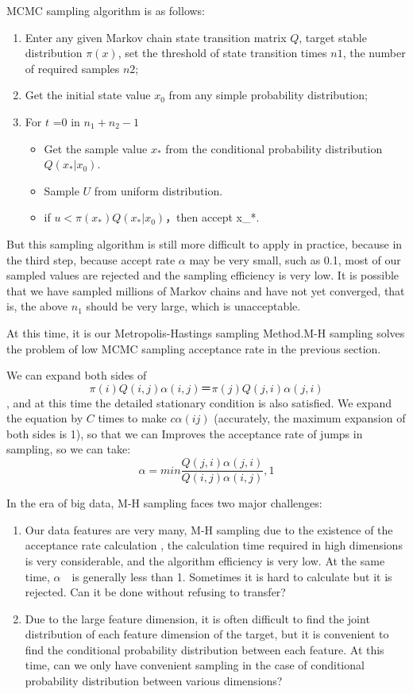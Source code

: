 MCMC sampling algorithm is as follows:
\begin{enumerate}
  \item Enter any given Markov chain state transition matrix $Q$, target stable distribution $\pi(x)$, set the threshold of state transition times $n1$, the number of required samples $n2$;
  \item Get the initial state value $x_0$ from any simple probability distribution;
  \item For $t$ =0 in $n_1+n_2-1$
    \begin{itemize}
      \item Get the sample value $x_*$ from the conditional probability distribution $Q(x_*|x_0)$.
      \item Sample $U$ from uniform distribution.
      \item if $u<\pi(x_*)Q(x_*|x_0)$，then accept x_*.
    \end{itemize}
\end{enumerate}


But this sampling algorithm is still more difficult to apply in practice, because in the third step, because accept rate $\alpha$ may be very small, such as 0.1, most of our sampled values ​​are rejected and the sampling efficiency is very low. It is possible that we have sampled millions of Markov chains and have not yet converged, that is, the above $n_1$ should be  very large, which is unacceptable.

At this time, it is our Metropolis-Hastings sampling Method.M-H sampling solves the problem of low MCMC sampling acceptance rate in the previous section.

We can expand both sides of \[
  \pi(i)Q(i,j)\alpha(i,j) ＝ \pi(j)Q(j,i)\alpha(j,i)
\], and at this time the detailed stationary condition is also satisfied. We expand the equation by $C$ times to make $c\alpha(ij)$ (accurately, the maximum expansion of both sides is 1), so that we can Improves the acceptance rate of jumps in sampling, so we can take:
\[
  \alpha = min{\frac{Q(j,i)\alpha(j,i)}{Q(i,j)\alpha(i,j)},1}
\]

In the era of big data, M-H sampling faces two major challenges:
\begin{enumerate}
  \item Our data features are very many, M-H sampling due to the existence of the acceptance rate calculation , the calculation time required in high dimensions is very considerable, and the algorithm efficiency is very low. At the same time, $\alpha$　is generally less than 1. Sometimes it is hard to calculate but it is rejected. Can it be done without refusing to transfer?
  \item Due to the large feature dimension, it is often difficult to find the joint distribution of each feature dimension of the target, but it is convenient to find the conditional probability distribution between each feature. At this time, can we only have convenient sampling in the case of conditional probability distribution between various dimensions?
\end{enumerate}

